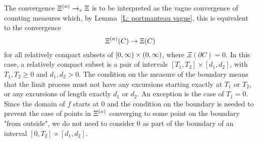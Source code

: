 \begin{note}
	The convergence
	$\Xi^{(n)} \rightarrow_v \Xi$
	is to be interpreted as the vague convergence of counting measures
	which, by Lemma~\ref{L: portmanteau vague},
	this is equivalent to the convergence
	\begin{equation}
	\Xi^{(n)}(C) \rightarrow \Xi(C)
	\end{equation}
	for all relatively compact subsets of
	$[0, \infty) \times (0, \infty)$,
	where $\Xi(\partial C) = 0$.
	In this case, a relatively compact subset is a pair of intervals
	$[T_1, T_2] \times [d_1, d_2]$,
	with $T_1, T_2 \geq 0$
	and $d_1, d_2 > 0$.
	The condition on the measure of the boundary means
	that the limit process must not have any excursions starting exactly at
	$T_1$ or $T_2$,
	or any excursions of length exactly $d_1$ or $d_2$.
	An exception is the case of $T_1=0$.
	Since the domain of $f$ starts at $0$
	and the condition on the boundary is needed to prevent the case of points in $\Xi^{(n)}$ converging to some point on the boundary "from outside",
	we do not need to consider $0$ as part of the boundary of an interval 
	$[0, T_2] \times [d_1, d_2]$.
\end{note}

